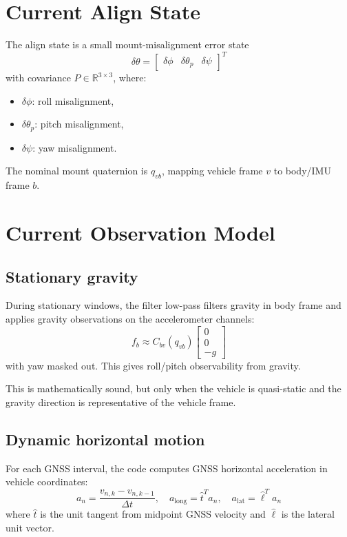 \documentclass[11pt]{article}
\begin{document}
\section{Current Align State}
The align state is a small mount-misalignment error state
\[
\delta \theta =
\begin{bmatrix}
\delta \phi & \delta \theta_p & \delta \psi
\end{bmatrix}^T
\]
with covariance \(P \in \mathbb{R}^{3 \times 3}\), where:
\begin{itemize}[leftmargin=1.5em]
\item \(\delta \phi\): roll misalignment,
\item \(\delta \theta_p\): pitch misalignment,
\item \(\delta \psi\): yaw misalignment.
\end{itemize}

The nominal mount quaternion is \(q_{vb}\), mapping vehicle frame \(v\) to body/IMU frame \(b\).

\section{Current Observation Model}
\subsection{Stationary gravity}
During stationary windows, the filter low-pass filters gravity in body frame and applies gravity observations on the accelerometer channels:
\[
f_b \approx C_{bv}(q_{vb}) \begin{bmatrix} 0 \\ 0 \\ -g \end{bmatrix}
\]
with yaw masked out. This gives roll/pitch observability from gravity.

This is mathematically sound, but only when the vehicle is quasi-static and the gravity direction is representative of the vehicle frame.

\subsection{Dynamic horizontal motion}
For each GNSS interval, the code computes GNSS horizontal acceleration in vehicle coordinates:
\[
a_n = \frac{v_{n,k} - v_{n,k-1}}{\Delta t},
\quad
a_{\text{long}} = \hat t^T a_n,
\quad
a_{\text{lat}} = \hat \ell^T a_n
\]
where \(\hat t\) is the unit tangent from midpoint GNSS velocity and \(\hat \ell\) is the lateral unit vector.
\end{document}
